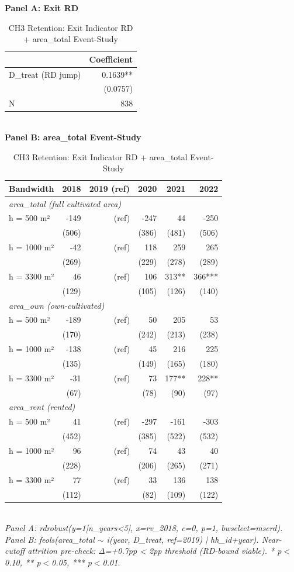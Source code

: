 \begin{table}[t]
\centering
\caption{CH3 Retention: Exit Indicator RD + area\_total Event-Study}
\label{tab:ch3_retention_en}
\textbf{Panel A: Exit RD}\\
\begin{tabular}{lr}
\toprule
 & Coefficient \\
\midrule
D\_treat (RD jump) & 0.1639** \\
 & (0.0757) \\
N          & 838 \\
\bottomrule
\end{tabular}\\[1ex]
\textbf{Panel B: area\_total Event-Study}\\
\begin{tabular}{lrrrrr}
\toprule
Bandwidth & 2018 & 2019 (ref) & 2020 & 2021 & 2022 \\
\midrule
\multicolumn{6}{l}{\textit{area\_total (full cultivated area)}} \\
\midrule
h = 500 m² & -149 & (ref) & -247 & 44 & -250 \\
       & (506) &  & (386) & (481) & (506) \\
h = 1000 m² & -42 & (ref) & 118 & 259 & 265 \\
       & (269) &  & (229) & (278) & (289) \\
h = 3300 m² & 46 & (ref) & 106 & 313** & 366*** \\
       & (129) &  & (105) & (126) & (140) \\
\midrule
\multicolumn{6}{l}{\textit{area\_own (own-cultivated)}} \\
\midrule
h = 500 m² & -189 & (ref) & 50 & 205 & 53 \\
       & (170) &  & (242) & (213) & (238) \\
h = 1000 m² & -138 & (ref) & 45 & 216 & 225 \\
       & (135) &  & (149) & (165) & (180) \\
h = 3300 m² & -31 & (ref) & 73 & 177** & 228** \\
       & (67) &  & (78) & (90) & (97) \\
\midrule
\multicolumn{6}{l}{\textit{area\_rent (rented)}} \\
\midrule
h = 500 m² & 41 & (ref) & -297 & -161 & -303 \\
       & (452) &  & (385) & (522) & (532) \\
h = 1000 m² & 96 & (ref) & 74 & 43 & 40 \\
       & (228) &  & (206) & (265) & (271) \\
h = 3300 m² & 77 & (ref) & 33 & 136 & 138 \\
       & (112) &  & (82) & (109) & (122) \\
\bottomrule
\end{tabular}\\
\footnotesize\textit{Panel A: rdrobust(y=1[n\_years<5], x=rv\_2018, c=0, p=1, bwselect=mserd). Panel B: feols(area\_total $\sim$ i(year, D\_treat, ref=2019) | hh\_id+year). Near-cutoff attrition pre-check: Δ=+0.7pp < 2pp threshold (RD-bound viable). * p$<$0.10, ** p$<$0.05, *** p$<$0.01.}
\end{table}

